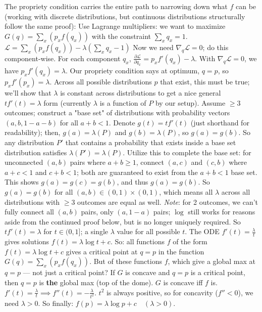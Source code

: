 \documentclass[12pt]{article}
\begin{document}
\begin{outline}
The propriety condition carries the entire path to narrowing down what $f$ can be (working with discrete distributions, but continuous distributions structurally follow the same proof):
\1 Use Lagrange multipliers: we want to maximize $\displaystyle G(q) = \sum_x (p_x f(q_x))$ with the constraint $\displaystyle \sum_x q_x = 1$.
\1 $\displaystyle \mathcal L = \sum_x (p_x f(q_x)) - \lambda \left(\sum_x q_x - 1\right)$
\1 Now we need $\nabla_q \mathcal L = 0$; do this component-wise. For each component $q_x$, $\displaystyle \frac{\partial \mathcal L}{\partial q_x} = p_x f'(q_x) - \lambda$. With $\nabla_q \mathcal L = 0$, we have $p_x f'(q_x) = \lambda$.
\1 Our propriety condition says at optimum, $q=p$, so $p_x f'(p_x) = \lambda$. Across all possible distributions $p$ that exist, this must be true; we'll show that $\lambda$ is constant across distributions to get a nice general $t f'(t) = \lambda$ form (currently $\lambda$ is a function of $P$ by our setup).
\2 Assume $\ge 3$ outcomes; construct a "base set" of distributions with probability vectors $(a,b,1-a-b)$ for all $a+b<1$. Denote $g(t)=t f'(t)$ (just shorthand for readability); then, $g(a)=\lambda(P)$ and $g(b)=\lambda(P)$, so $g(a)=g(b)$. So any distribution $P'$ that contains a probability that exists inside a base set distribution satisfies $\lambda(P')=\lambda(P)$.
\2 Utilize this to complete the base set: for unconnected $(a,b)$ pairs where $a+b \ge 1$, connect $(a,c)$ and $(c,b)$ where $a+c<1$ and $c+b<1$; both are guaranteed to exist from the $a+b<1$ base set. This shows $g(a)=g(c)=g(b)$, and thus $g(a)=g(b)$.
\2 So $g(a)=g(b)$ for all $(a,b) \in (0,1) \times (0,1)$, which means all $\lambda$ across all distributions with $\ge 3$ outcomes are equal as well.
\2 \textit{Note}: for 2 outcomes, we can't fully connect all $(a,b)$ pairs, only $(a,1-a)$ pairs; $\log$ still works for reasons aside from the continued proof below, but is no longer uniquely required.
\1 So $t f'(t) = \lambda$ for $t \in (0,1]$; a single $\lambda$ value for all possible $t$.
\1 The ODE $\displaystyle f'(t) = \frac{\lambda}{t}$ gives solutions $f(t)=\lambda \log t + c$. So: all functions $f$ of the form $f(t)=\lambda \log t + c$ gives a critical point at $q=p$ in the function $\displaystyle G(q) = \sum_x (p_x f(q_x))$. But of these functions $f$, which give a global max at $q=p$ --- not just a critical point?
\2 If $G$ is concave and $q=p$ is a critical point, then $q=p$ is \textbf{the} global max (top of the dome).
\2 $G$ is concave iff $f$ is. $\displaystyle f'(t) = \frac{\lambda}{t} \implies f''(t) = -\frac{\lambda}{t^2}$. $t^2$ is always positive, so for concavity ($f'' < 0$), we need $\lambda > 0$.
\1 So finally: $\displaystyle \boxed{f(p) = \lambda \log p + c \quad (\lambda > 0)}$.
\\\0


\end{outline}
\end{document}
